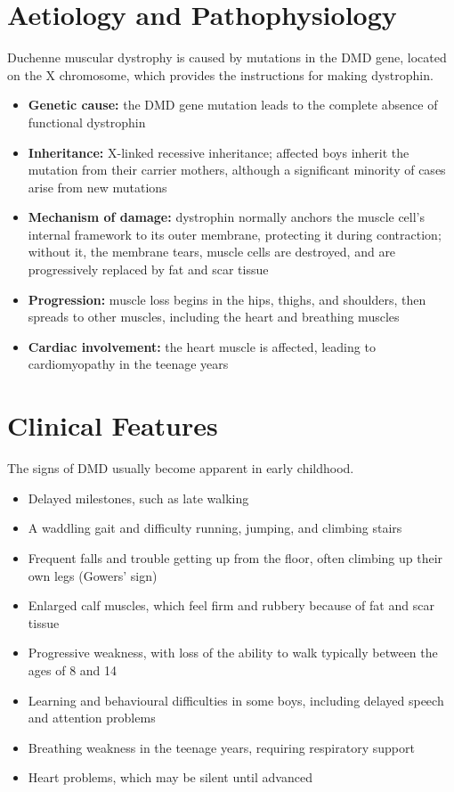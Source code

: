 \section*{Aetiology and Pathophysiology}
Duchenne muscular dystrophy is caused by mutations in the DMD gene, located on the X chromosome, which provides the instructions for making dystrophin.
\begin{itemize}
    \item \textbf{Genetic cause:} the DMD gene mutation leads to the complete absence of functional dystrophin
    \item \textbf{Inheritance:} X-linked recessive inheritance; affected boys inherit the mutation from their carrier mothers, although a significant minority of cases arise from new mutations
    \item \textbf{Mechanism of damage:} dystrophin normally anchors the muscle cell's internal framework to its outer membrane, protecting it during contraction; without it, the membrane tears, muscle cells are destroyed, and are progressively replaced by fat and scar tissue
    \item \textbf{Progression:} muscle loss begins in the hips, thighs, and shoulders, then spreads to other muscles, including the heart and breathing muscles
    \item \textbf{Cardiac involvement:} the heart muscle is affected, leading to cardiomyopathy in the teenage years
\end{itemize}

\section*{Clinical Features}
The signs of DMD usually become apparent in early childhood.
\begin{itemize}
    \item Delayed milestones, such as late walking
    \item A waddling gait and difficulty running, jumping, and climbing stairs
    \item Frequent falls and trouble getting up from the floor, often climbing up their own legs (Gowers' sign)
    \item Enlarged calf muscles, which feel firm and rubbery because of fat and scar tissue
    \item Progressive weakness, with loss of the ability to walk typically between the ages of 8 and 14
    \item Learning and behavioural difficulties in some boys, including delayed speech and attention problems
    \item Breathing weakness in the teenage years, requiring respiratory support
    \item Heart problems, which may be silent until advanced
\end{itemize}


